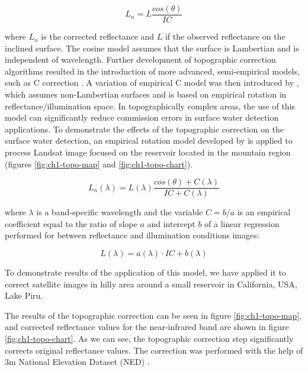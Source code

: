 \begin{equation}
\label{eq:cosine}
L_n = L \frac{cos(\theta)}{IC}
\end{equation}

where $L_n$ is the corrected reflectance and $L$ if the observed reflectance on the inclined surface. The cosine model assumes that the surface is Lambertian and is independent of wavelength. Further development of topographic correction algorithms resulted in the introduction of more advanced, semi-empirical models, such as C correction \citep{teillet1982slope}. A variation of empirical C model was then introduced by \citep{tan2013improved}, which assumes non-Lambertian surfaces and is based on empirical rotation in reflectance/illumination space. In topographically complex areas, the use of this model can significantly reduce commission errors in surface water detection applications. To demonstrate the effects of the topographic correction on the surface water detection, an empirical rotation model developed by \citep{tan2013improved} is applied to process Landsat image focused on the reservoir located in the mountain region (figures \ref{fig:ch1-topo-map} and \ref{fig:ch1-topo-chart}). 

\begin{equation}
\label{eq:topo-c}
L_n(\lambda) = L(\lambda) \frac{cos(\theta) + C(\lambda)}{IC + C(\lambda)}
\end{equation}

where ${\lambda}$ is a band-specific wavelength and the variable $C = b / a$ is an empirical coefficient equal to the ratio of slope $a$ and intercept $b$ of a linear regression performed for between reflectance and illumination conditions images:

\begin{equation}
\label{eq:topo-c-regression}
L(\lambda) = a(\lambda) \cdot IC + b(\lambda)
\end{equation}

To demonstrate results of the application of this model, we have applied it to correct satellite images in hilly area around a small reservoir in California, USA, Lake Piru.

The results of the topographic correction can be seen in figure \ref{fig:ch1-topo-map}, and corrected reflectance values for the near-infrared band are shown in figure \ref{fig:ch1-topo-chart}. As we can see, the topographic correction step significantly corrects original reflectance values. The correction was performed with the help of 3m National Elevation Dataset (NED) \cite{gesch2002national}.

